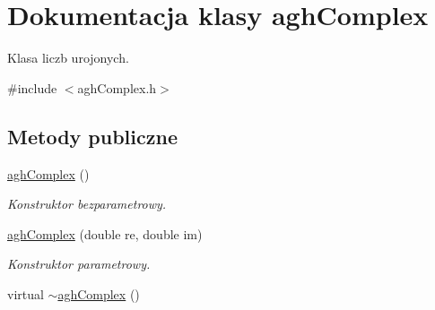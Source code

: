 \hypertarget{classaghComplex}{\section{Dokumentacja klasy agh\-Complex}
\label{classaghComplex}
}


Klasa liczb urojonych.  




{\ttfamily \#include $<$agh\-Complex.\-h$>$}

\subsection*{Metody publiczne}
\begin{DoxyCompactItemize}
\item 
\hypertarget{classaghComplex_a125a2ef123aee0e45af44dbc95d17df2}{\hyperlink{classaghComplex_a125a2ef123aee0e45af44dbc95d17df2}{agh\-Complex} ()}\label{classaghComplex_a125a2ef123aee0e45af44dbc95d17df2}

\begin{DoxyCompactList}\small\item\em Konstruktor bezparametrowy. \end{DoxyCompactList}\item 
\hyperlink{classaghComplex_abf8babc2bd12a47b5c6776f48b011929}{agh\-Complex} (double re, double im)
\begin{DoxyCompactList}\small\item\em Konstruktor parametrowy. \end{DoxyCompactList}\item 
\hypertarget{classaghComplex_aa283826062a93f54ecb9077f06968d43}{virtual \hyperlink{classaghComplex_aa283826062a93f54ecb9077f06968d43}{$\sim$agh\-Complex} ()}\label{classaghComplex_aa283826062a93f54ecb9077f06968d43}


\end{DoxyCompactItemize}
